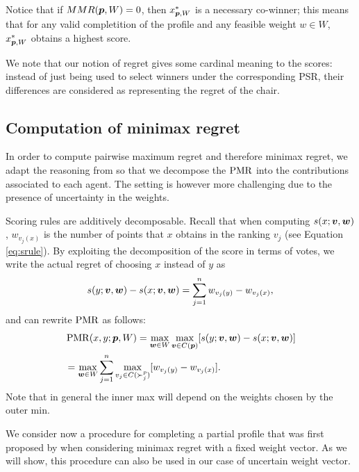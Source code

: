 Notice that if $MMR({\bm{p}}, W)=0$, then $x^{*}_{{\bm{p}},W}$  is a necessary co-winner; this means that for any valid completition of the profile and any feasible weight $w \in W$, $x^{*}_{{\bm{p}},W}$ obtains a highest score.

We note that our notion of regret gives some cardinal meaning to the scores: instead of just being used to select winners under the corresponding PSR, their differences are considered as representing the regret of the chair.


\subsection{Computation of minimax regret}
In order to compute pairwise maximum regret and therefore minimax regret, we adapt the reasoning from \citet{Lu2011} so that we decompose the $\operatorname{PMR}$ into the contributions associated to each agent.
The setting is however more challenging due to the presence of uncertainty in the weights.

Scoring rules are additively decomposable.
Recall that when computing $s(x; \bm{v}, \bm{w})$, $w_{v_j(x)}$ is the number of points that $x$ obtains in the ranking $v_j$ (see Equation \ref{eq:srule}).
By exploiting the decomposition of the score in terms of votes, we write the actual regret of choosing $x$ instead of $y$ as
\[
s(y; \bm{v},\bm{w}) - s(x; \bm{v}, \bm{w}) = \sum_{j=1}^n w_{v_j(y)} - w_{v_j(x)},
\]
and  can rewrite $\operatorname{PMR}$ as follows:
\begin{align*}
& \operatorname{PMR}(x,y; {\bm{p}}, W) = \max_{\bm{w} \in W} \max_{\bm{v} \in C({\bm{p}})} [ s(y; \bm{v},\bm{w}) - s(x; \bm{v},\bm{w}) ] \\
& =  \max_{\bm{w} \in W} \sum_{j=1}^{n} \max_{v_j \in C(\succ_j^p)} [w_{v_j(y)} - w_{v_j(x)}]. \\
\end{align*}
Note that in general the inner max will depend on the weights chosen by the outer min.

We consider now a procedure for completing a partial profile that was first proposed by \citet{Lu2011} when considering minimax regret with a fixed weight vector.
As we will show, this procedure can also be used in our case of uncertain weight vector.

